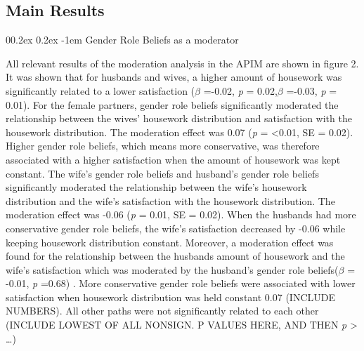 \documentclass[
  man,floatsintext]{apa6}
\makeatletter
\let\oldparagraph\paragraph
\renewcommand{\paragraph}[1]{\oldparagraph{#1}\mbox{}}
\renewcommand{\paragraph}{\@startsection{paragraph}{4}{\parindent}%
  {0\baselineskip \@plus 0.2ex \@minus 0.2ex}%
  {-1em}%
  {\normalfont\normalsize\bfseries\itshape\typesectitle}}
\makeatother
\begin{document}
\hypertarget{main-results}{%
\subsection{Main Results}\label{main-results}}

\hypertarget{gender-role-beliefs-as-a-moderator}{%
\paragraph{Gender Role Beliefs as a moderator}\label{gender-role-beliefs-as-a-moderator}}

All relevant results of the moderation analysis in the APIM are shown in figure 2. It was shown that for husbands and wives, a higher amount of housework was significantly related to a lower satisfaction (\(\beta\) =-0.02, \emph{p} = 0.02,\(\beta\) =-0.03, \emph{p} = 0.01).
For the female partners, gender role beliefs significantly moderated the relationship between the wives' housework distribution and satisfaction with the housework distribution. The moderation effect was 0.07 (\emph{p} = \textless0.01, SE = 0.02). Higher gender role beliefs, which means more conservative, was therefore associated with a higher satisfaction when the amount of housework was kept constant. The wife's gender role beliefs and husband's gender role beliefs significantly moderated the relationship between the wife's housework distribution and the wife's satisfaction with the housework distribution. The moderation effect was -0.06 (\emph{p} = 0.01, SE = 0.02). When the husbands had more conservative gender role beliefs, the wife's satisfaction decreased by -0.06 while keeping housework distribution constant.
Moreover, a moderation effect was found for the relationship between the husbands amount of housework and the wife's satisfaction which was moderated by the husband's gender role beliefs(\(\beta\) = -0.01, \emph{p} =0.68) . More conservative gender role beliefs were associated with lower satisfaction when housework distribution was held constant 0.07 (INCLUDE NUMBERS).
All other paths were not significantly related to each other (INCLUDE LOWEST OF ALL NONSIGN. P VALUES HERE, AND THEN \emph{p} \textgreater{} \ldots)
\end{document}
